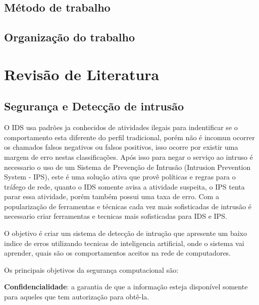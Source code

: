 \documentclass[
	12pt,				%
	openright,			%
	oneside,
	a4paper,			%
	english,			%
	french,				%
	spanish,			%
	brazil				%
	]{abntex2}
\begin{document}
\section{Método de trabalho}



\section{Organização do trabalho}



\chapter[Revisão de Literatura]{Revisão de Literatura}
\section{Segurança e Detecção de intrusão}

O IDS usa padrões ja conhecidos de atividades ilegais para indentificar se o comportamento esta diferente do perfil tradicional, porém não é incomun ocorrer os chamados falsos negativos ou falsos positivos, isso ocorre por existir uma margem de erro nestas classificações. 
Após isso para negar o serviço ao intruso é necessario o uso de um Sistema de Prevenção de Intrusão (Intrusion Prevention System - IPS), este é uma solução ativa que provê políticas e regras para o tráfego de rede, quanto o IDS somente avisa a atividade suspeita, o IPS tenta parar essa atividade, porém também possui uma taxa de erro.
Com a popularização de ferramentas e técnicas cada vez mais sofisticadas de intrusão é necessario criar ferramentas e tecnicas mais sofisticadas para IDS e IPS.

O objetivo é criar um sistema de detecção de intrução que apresente um baixo indice de erros utilizando tecnicas de inteligencia artificial, onde o sistema vai aprender, quais são os comportamentos aceitos na rede de computadores.

Os principais objetivos da segurança computacional são:

\textbf{Confidencialidade}: a garantia de que a informação esteja disponível somente para aqueles que tem autorização para obtê-la.
\end{document}
